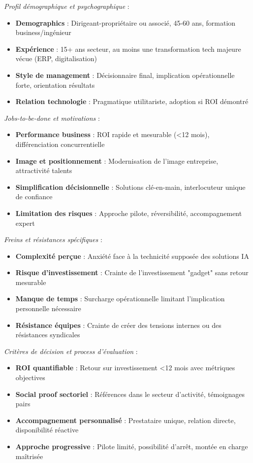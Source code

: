 \emph{Profil démographique et psychographique} :
\begin{itemize}
    \item \textbf{Demographics} : Dirigeant-propriétaire ou associé, 45-60 ans, formation business/ingénieur
    \item \textbf{Expérience} : 15+ ans secteur, au moins une transformation tech majeure vécue (ERP, digitalisation)
    \item \textbf{Style de management} : Décisionnaire final, implication opérationnelle forte, orientation résultats
    \item \textbf{Relation technologie} : Pragmatique utilitariste, adoption si ROI démontré
\end{itemize}
\medskip
\emph{Jobs-to-be-done et motivations} \cite{christensen2016competing} :
\begin{itemize}
    \item \textbf{Performance business} : ROI rapide et mesurable (<12 mois), différenciation concurrentielle
    \item \textbf{Image et positionnement} : Modernisation de l'image entreprise, attractivité talents
    \item \textbf{Simplification décisionnelle} : Solutions clé-en-main, interlocuteur unique de confiance
    \item \textbf{Limitation des risques} : Approche pilote, réversibilité, accompagnement expert
\end{itemize}
\medskip
\emph{Freins et résistances spécifiques} :
\begin{itemize}
    \item \textbf{Complexité perçue} : Anxiété face à la technicité supposée des solutions IA
    \item \textbf{Risque d'investissement} : Crainte de l'investissement "gadget" sans retour mesurable
    \item \textbf{Manque de temps} : Surcharge opérationnelle limitant l'implication personnelle nécessaire
    \item \textbf{Résistance équipes} : Crainte de créer des tensions internes ou des résistances syndicales
\end{itemize}
\medskip
\emph{Critères de décision et process d'évaluation} :
\begin{itemize}
    \item \textbf{ROI quantifiable} : Retour sur investissement <12 mois avec métriques objectives
    \item \textbf{Social proof sectoriel} : Références dans le secteur d'activité, témoignages pairs
    \item \textbf{Accompagnement personnalisé} : Prestataire unique, relation directe, disponibilité réactive
    \item \textbf{Approche progressive} : Pilote limité, possibilité d'arrêt, montée en charge maîtrisée
\end{itemize}
